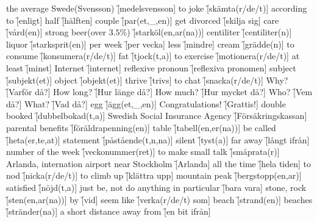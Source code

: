\begin{questions}
    \begin{multicols}{2}
        \raggedcolumns
        \question the average Swede(Svensson) \f[medelsvensson]
        \question to joke \f[skämta(r/de/t)]
        \question according to \f[enligt]
        \question half \f[hälften]
        \question couple \f[par(et,\_,en)]
        \question get divorced \f[skilja sig]
        \question care \f[vård(en)]
        \question strong beer(over $3.5\%$) \f[starköl(en,ar(na))]
        \question centiliter \f[centiliter(n)]
        \question liquor \f[starksprit(en)]
        \question per week \f[per vecka]
        \question less \f[mindre]
        \question cream \f[grädde(n)]
        \question to consume \f[konsumera(r/de/t)]
        \question fat \f[tjock(t,a)]
        \question to exercise \f[motionera(r/de/t)]
        \question at least \f[minst]
        \question Internet \f[internet]
        \question reflexive pronoun \f[reflexiva pronomen]
        \question subject \f[subjekt(et)]
        \question object \f[objekt(et)]
        \question thrive \f[trivs]
        \question to chat \f[snacka(r/de/t)]
        \question Why? \f[Varför då?]
        \question How long? \f[Hur länge då?]
        \question How much? \f[Hur mycket då?]
        \question Who? \f[Vem då?]
        \question What? \f[Vad då?]
        \question egg \f[ägg(et,\_,en)]
        \question Congratulations! \f[Grattis!]
        \question double booked \f[dubbelbokad(t,a)]
        \question Swedish Social Insurance Agency \f[Försäkringskassan]
        \question parental benefits \f[föräldrapenning(en)]
        \question table \f[tabell(en,er(na))]
        \question be called \f[heta(er,te,at)]
        \question statement \f[påstående(t,n,na)]
        \question silent \f[tyst(a)]
        \question far away \f[långt ifrån]
        \question number of the week \f[veckonummer(ret)]
        \question to make small talk \f[småprata(r)]
        \question Arlanda, internation airport near Stockholm \f[Arlanda]
        \question all the time \f[hela tiden]
        \question to nod \f[nicka(r/de/t)]
        \question to climb up \f[klättra upp]
        \question mountain peak \f[bergstopp(en,ar)]
        \question satisfied \f[nöjd(t,a)]
        \question just be, not do anything in particular \f[bara vara]
        \question stone, rock \f[sten(en,ar(na))]
        \question by \f[vid]
        \question seem like \f[verka(r/de/t) som]
        \question beach \f[strand(en)]
        \question beaches \f[stränder(na)]
        \question a short distance away from \f[en bit ifrån]

\end{multicols}
\end{questions}

